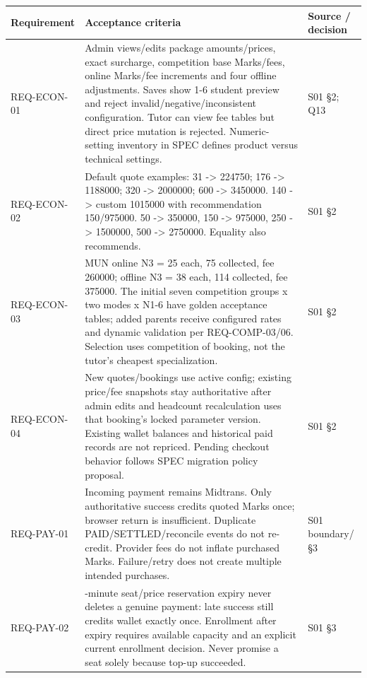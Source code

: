 \documentclass[11pt,a4paper]{article}
\newcounter{none}
\begin{document}
{\def\LTcaptype{none} %
\begin{longtable}[]{@{}
  >{\raggedright\arraybackslash}p{}
  >{\raggedright\arraybackslash}p{}
  >{\raggedright\arraybackslash}p{}@{}}
\toprule\noalign{}
\begin{minipage}[b]{\linewidth}\raggedright
Requirement
\end{minipage} & \begin{minipage}[b]{\linewidth}\raggedright
Acceptance criteria
\end{minipage} & \begin{minipage}[b]{\linewidth}\raggedright
Source / decision
\end{minipage} \\
\midrule\noalign{}
\endhead
\bottomrule\noalign{}
\endlastfoot
REQ-ECON-01 & Admin views/edits package amounts/prices, exact surcharge, competition base Marks/fees, online Marks/fee increments and four offline adjustments. Saves show 1-6 student preview and reject invalid/negative/inconsistent configuration. Tutor can view fee tables but direct price mutation is rejected. Numeric-setting inventory in SPEC defines product versus technical settings. & S01 §2; Q13 \\
REQ-ECON-02 & Default quote examples: 31 -\textgreater{} 224750; 176 -\textgreater{} 1188000; 320 -\textgreater{} 2000000; 600 -\textgreater{} 3450000. 140 -\textgreater{} custom 1015000 with recommendation 150/975000. 50 -\textgreater{} 350000, 150 -\textgreater{} 975000, 250 -\textgreater{} 1500000, 500 -\textgreater{} 2750000. Equality also recommends. & S01 §2 \\
REQ-ECON-03 & MUN online N3 = 25 each, 75 collected, fee 260000; offline N3 = 38 each, 114 collected, fee 375000. The initial seven competition groups x two modes x N1-6 have golden acceptance tables; added parents receive configured rates and dynamic validation per REQ-COMP-03/06. Selection uses competition of booking, not the tutor's cheapest specialization. & S01 §2 \\
REQ-ECON-04 & New quotes/bookings use active config; existing price/fee snapshots stay authoritative after admin edits and headcount recalculation uses that booking's locked parameter version. Existing wallet balances and historical paid records are not repriced. Pending checkout behavior follows SPEC migration policy proposal. & S01 §2 \\
REQ-PAY-01 & Incoming payment remains Midtrans. Only authoritative success credits quoted Marks once; browser return is insufficient. Duplicate PAID/SETTLED/reconcile events do not re-credit. Provider fees do not inflate purchased Marks. Failure/retry does not create multiple intended purchases. & S01 boundary/§3 \\
REQ-PAY-02 & 15-minute seat/price reservation expiry never deletes a genuine payment: late success still credits wallet exactly once. Enrollment after expiry requires available capacity and an explicit current enrollment decision. Never promise a seat solely because top-up succeeded. & S01 §3 \\
\end{longtable}
}
\end{document}
